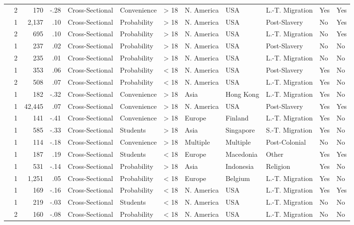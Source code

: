 \documentclass[10pt, letterpaper]{article}
\begin{document}
\begin{landscape}
\begin{xltabular}{650pt}{Xrrrllrlllll}
 & 2 & 170 & -.28 & Cross-Sectional & Convenience & > 18 & N. America & USA & L.-T. Migration & Yes & Yes\\
\cite{1407} & 1 & 2,137 & .10 & Cross-Sectional & Probability & > 18 & N. America & USA & Post-Slavery & No & Yes\\
 & 2 & 695 & .10 & Cross-Sectional & Probability & > 18 & N. America & USA & L.-T. Migration & No & Yes\\
\cite{1494} & 1 & 237 & .02 & Cross-Sectional & Probability & > 18 & N. America & USA & Post-Slavery & No & No\\
 & 2 & 235 & .01 & Cross-Sectional & Probability & > 18 & N. America & USA & L.-T. Migration & No & No\\
\cite{324} & 1 & 353 & .06 & Cross-Sectional & Probability & < 18 & N. America & USA & Post-Slavery & Yes & No\\
 & 2 & 508 & .07 & Cross-Sectional & Probability & < 18 & N. America & USA & L.-T. Migration & Yes & No\\
\cite{609} & 1 & 182 & -.32 & Cross-Sectional & Convenience & > 18 & Asia & Hong Kong & L.-T. Migration & Yes & No\\
\cite{2001} & 1 & 42,445 & .07 & Cross-Sectional & Convenience & > 18 & N. America & USA & Post-Slavery & Yes & Yes\\
\cite{2341} & 1 & 141 & -.41 & Cross-Sectional & Convenience & > 18 & Europe & Finland & L.-T. Migration & Yes & No\\
\cite{19} & 1 & 585 & -.33 & Cross-Sectional & Students & > 18 & Asia & Singapore & S.-T. Migration & Yes & No\\
\cite{303} & 1 & 114 & -.18 & Cross-Sectional & Convenience & > 18 & Multiple & Multiple & Post-Colonial & No & No\\
\cite{856} & 1 & 187 & .19 & Cross-Sectional & Students & < 18 & Europe & Macedonia & Other & Yes & Yes\\
\cite{1411} & 1 & 531 & -.14 & Cross-Sectional & Probability & > 18 & Asia & Indonesia & Religion & Yes & No\\
\cite{4002} & 1 & 1,251 & .05 & Cross-Sectional & Probability & < 18 & Europe & Belgium & L.-T. Migration & Yes & No\\
\cite{1525} & 1 & 169 & -.16 & Cross-Sectional & Probability & < 18 & N. America & USA & L.-T. Migration & Yes & Yes\\
\cite{830} & 1 & 219 & -.03 & Cross-Sectional & Students & < 18 & N. America & USA & L.-T. Migration & No & No\\
 & 2 & 160 & -.08 & Cross-Sectional & Probability & < 18 & N. America & USA & L.-T. Migration & No & No\\

\end{xltabular}
\end{landscape}
\end{document}

